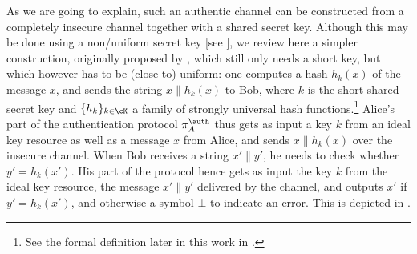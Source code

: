 As we are going to explain, such an authentic channel can be
constructed from a completely insecure channel together with a shared
secret key. Although this may be done using a non\-/uniform secret key
[see \textcite{RW03,DW09,ACLV19}], we review here a simpler
construction, originally proposed by \textcite{WC81}, which still only
needs a short key, but which however has to be (close to) uniform: one
computes a hash $h_k(x)$ of the message $x$, and sends the string
$x \| h_k(x)$ to Bob, where $k$ is the short shared secret key and
$\{h_k\}_{k \in \cK}$ a family of strongly universal hash
functions.\footnote{See the formal definition later in this work in
  .} Alice's part of the authentication
protocol $\pi^{\auth}_A$ thus gets as input a key $k$ from an ideal
key resource as well as a message $x$ from Alice, and sends
$x \| h_k(x)$ over the insecure channel. When Bob receives a string
$x' \| y'$, he needs to check whether $y' = h_k(x')$. His part of the
protocol hence gets as input the key $k$ from the ideal key resource,
the message $x' \| y'$ delivered by the channel, and outputs $x'$ if
$y' = h_k(x')$, and otherwise a symbol $\bot$ to indicate an
error. This is depicted in .

